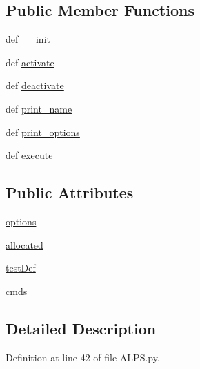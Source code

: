 \subsection*{Public Member Functions}
\begin{DoxyCompactItemize}
\item 
def \hyperlink{class_a_l_p_s_1_1_a_l_p_s_a45417f6290435c66b3f3b7c4586915d9}{\-\_\-\-\_\-init\-\_\-\-\_\-}
\item 
def \hyperlink{class_a_l_p_s_1_1_a_l_p_s_a3d507bd3feb505c8ed1b4e8f3729d636}{activate}
\item 
def \hyperlink{class_a_l_p_s_1_1_a_l_p_s_aa1d63291a23bcca8ccbd44dc4d0fa6bf}{deactivate}
\item 
def \hyperlink{class_a_l_p_s_1_1_a_l_p_s_a97e56ee7f5faaea26121d6ee0deeddab}{print\-\_\-name}
\item 
def \hyperlink{class_a_l_p_s_1_1_a_l_p_s_a68c17d876ad850e44d40aa082b674f4e}{print\-\_\-options}
\item 
def \hyperlink{class_a_l_p_s_1_1_a_l_p_s_af4b8efc64ea3abc5fb21fb93bfe052ff}{execute}
\end{DoxyCompactItemize}
\subsection*{Public Attributes}
\begin{DoxyCompactItemize}
\item 
\hyperlink{class_a_l_p_s_1_1_a_l_p_s_a24dfa9b508f507c4cb6148f10a081555}{options}
\item 
\hyperlink{class_a_l_p_s_1_1_a_l_p_s_ac371dce53e8c120f7031259025562bdb}{allocated}
\item 
\hyperlink{class_a_l_p_s_1_1_a_l_p_s_a839c4f84a46683221d51004c08345ff2}{test\-Def}
\item 
\hyperlink{class_a_l_p_s_1_1_a_l_p_s_a64bae95ba692ef4df06f716692b50ee9}{cmds}
\end{DoxyCompactItemize}


\subsection{Detailed Description}


Definition at line 42 of file A\-L\-P\-S.\-py.



